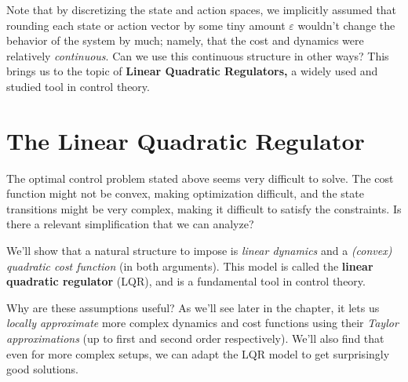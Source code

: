 \documentclass[\main/main]{subfiles}
\begin{document}
Note that by discretizing the state and action spaces, we implicitly assumed that rounding each state or action vector by some tiny amount $\varepsilon$
wouldn't change the behavior of the system by much;
namely, that the cost and dynamics were relatively \emph{continuous}.
Can we use this continuous structure in other ways? This brings us to the topic of \textbf{Linear Quadratic Regulators,} a widely used and studied tool in control theory.

\section{The Linear Quadratic Regulator} \label{sec:lqr}

The optimal control problem stated above seems very difficult to solve.
The cost function might not be convex, making optimization difficult,
and the state transitions might be very complex, making it difficult to satisfy the constraints.
Is there a relevant simplification that we can analyze?

We'll show that a natural structure to impose is \emph{linear dynamics} and a \emph{(convex) quadratic cost function} (in both arguments). This model is called the \textbf{linear quadratic regulator} (LQR), and is a fundamental tool in control theory.

Why are these assumptions useful?
As we'll see later in the chapter,
it lets us \emph{locally approximate} more complex dynamics and cost functions using their \emph{Taylor approximations} (up to first and second order respectively).
We'll also find that even for more complex setups,
we can adapt the LQR model to get surprisingly good solutions.
\end{document}
